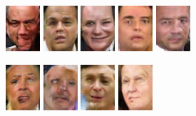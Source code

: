 \begin{figure}[!h]
{        \includegraphics[scale=1]{figures/lfw/appendix3/lfw64x48color_image0051.png}
        \includegraphics[scale=1]{figures/lfw/appendix3/lfw64x48color_image0052.png}
        \includegraphics[scale=1]{figures/lfw/appendix3/lfw64x48color_image0053.png}
        \includegraphics[scale=1]{figures/lfw/appendix3/lfw64x48color_image0054.png}
        \includegraphics[scale=1]{figures/lfw/appendix3/lfw64x48color_image0055.png}
    }
    \vspace{0.1cm}
    \centerline{
        \includegraphics[scale=1]{figures/lfw/appendix3/lfw64x48color_image0056.png}
        \includegraphics[scale=1]{figures/lfw/appendix3/lfw64x48color_image0057.png}
        \includegraphics[scale=1]{figures/lfw/appendix3/lfw64x48color_image0058.png}
        \includegraphics[scale=1]{figures/lfw/appendix3/lfw64x48color_image0059.png}
}
\end{figure}
